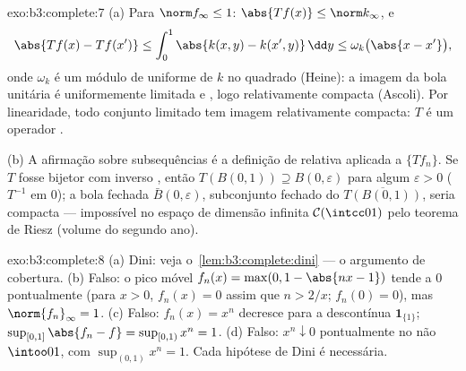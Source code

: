 \begin{solution}{exo:b3:complete:7}
(a) Para $\norm f_\infty \leq 1$: $\abs{Tf(x)} \leq
\norm k_\infty$, e
\[
\abs{Tf(x) - Tf(x')} \leq \int_0^1\abs{k(x,y) -
k(x',y)}\,\dd y \leq \omega_k\bigl(\abs{x - x'}\bigr),
\]
onde $\omega_k$ é um módulo de  uniforme de $k$ no
quadrado  (Heine): a imagem da bola unitária é
uniformemente limitada e , logo relativamente compacta
(Ascoli). Por linearidade, todo conjunto limitado tem imagem
relativamente compacta: $T$ é um operador .

(b) A afirmação sobre subsequências é a definição de 
relativa aplicada a $\{Tf_n\}$. Se $T$ fosse bijetor com
inverso , então $T(B(0,1)) \supseteq B(0,
\varepsilon)$ para algum $\varepsilon > 0$ ($T^{-1}$ 
em $0$); a bola fechada $\bar B(0,\varepsilon)$, subconjunto
fechado do  $\overline{T(B(0,1))}$, seria compacta
--- impossível no espaço de dimensão infinita $\mathcal
C(\intcc01)$ pelo teorema de Riesz (volume do segundo ano).
\end{solution}

\begin{solution}{exo:b3:complete:8}
(a) Dini: veja o~\cref{lem:b3:complete:dini} --- o argumento
de cobertura. (b) Falso: o pico móvel $f_n(x) = \max(0, 1 -
\abs{nx - 1})$ tende a $0$ pontualmente (para $x > 0$, $f_n(x) =
0$ assim que $n > 2/x$; $f_n(0) = 0$), mas $\norm{f_n}_\infty = 1$.
(c) Falso: $f_n(x) = x^n$ decresce para a descontínua
$\mathbf 1_{\{1\}}$; $\sup_{[0,1]}\abs{f_n - f} = \sup_{[0,1)}
x^n = 1$. (d) Falso: $x^n \downarrow 0$ pontualmente no
não  $\intoo01$, com $\sup_{(0,1)}x^n = 1$. Cada
hipótese de Dini é necessária.
\end{solution}

